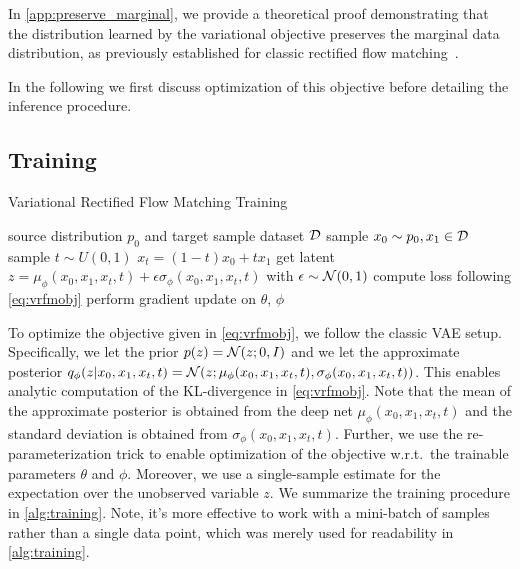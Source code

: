In \cref{app:preserve_marginal}, we provide a theoretical proof demonstrating that the distribution learned by the variational objective preserves the marginal data distribution, as previously established for classic rectified flow matching~\citep{liu2023flow}. 

In the following we first discuss optimization of this objective before detailing the inference procedure.

\subsection{Training}
\label{sec:method:train}




\begin{algorithm}[tb]
\caption{Variational Rectified Flow Matching Training}
\label{alg:training}
\begin{algorithmic}
    source distribution $p_0$ and target sample dataset ${\cal D}$
       \STATE sample $x_0 \sim p_0, x_1 \in {\cal D}$ 
       \STATE sample $t \sim U(0,1)$ 
       \STATE $x_t = (1-t)x_0 + tx_1$\;
       \STATE get latent  $z = \mu_\phi(x_0,x_1,x_t,t) + \epsilon\sigma_\phi(x_0,x_1,x_t,t)$ with $\epsilon\sim{\cal N}(0,1)$\label{alg:training:new} 
       \STATE compute loss following \cref{eq:vrfmobj}\;
       \STATE perform gradient update on $\theta$, $\phi$\;
   \ENDWHILE
\end{algorithmic}
\end{algorithm}


To optimize the objective given in \cref{eq:vrfmobj}, we follow the classic VAE setup. Specifically, we let the prior $p(z)={\cal N}(z;0,I)$ and we let the approximate posterior $q_\phi(z|x_0,x_1,x_t,t) = {\cal N}(z; \mu_\phi(x_0,x_1,x_t,t),\sigma_\phi(x_0,x_1,x_t,t))$. This enables analytic computation of the KL-divergence in \cref{eq:vrfmobj}. Note that the mean of the approximate posterior is obtained from the deep net $\mu_\phi(x_0,x_1,x_t,t)$ and the standard deviation is obtained from $\sigma_\phi(x_0,x_1,x_t,t)$. Further, we use the re-parameterization trick to enable optimization of the objective w.r.t.\ the trainable parameters $\theta$ and $\phi$. Moreover, we use a single-sample estimate for the expectation over the unobserved variable $z$.  We summarize the training procedure in \cref{alg:training}. Note, it's more effective to work with a mini-batch of samples rather than a single data point, which was merely used for readability in \cref{alg:training}.

